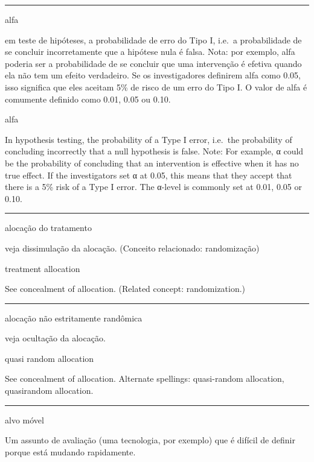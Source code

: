 \documentclass[
]{book}
\begin{document}
\begin{center}\rule{0.5\linewidth}{0.5pt}\end{center}

alfa

em teste de hipóteses, a probabilidade de erro do Tipo I, i.e.~a probabilidade de se concluir incorretamente que a hipótese nula é falsa. Nota: por exemplo, alfa poderia ser a probabilidade de se concluir que uma intervenção é efetiva quando ela não tem um efeito verdadeiro. Se os investigadores definirem alfa como 0.05, isso significa que eles aceitam 5\% de risco de um erro do Tipo I. O valor de alfa é comumente definido como 0.01, 0.05 ou 0.10.

alfa

In hypothesis testing, the probability of a Type I error, i.e.~the probability of concluding incorrectly that a null hypothesis is false. Note: For example, α could be the probability of concluding that an intervention is effective when it has no true effect. If the investigators set α at 0.05, this means that they accept that there is a 5\% risk of a Type I error. The α-level is commonly set at 0.01, 0.05 or 0.10.

\begin{center}\rule{0.5\linewidth}{0.5pt}\end{center}

alocação do tratamento

veja dissimulação da alocação. (Conceito relacionado: randomização)

treatment allocation

See concealment of allocation. (Related concept: randomization.)

\begin{center}\rule{0.5\linewidth}{0.5pt}\end{center}

alocação não estritamente randômica

veja ocultação da alocação.

quasi random allocation

See concealment of allocation. Alternate spellings: quasi-random allocation, quasirandom allocation.

\begin{center}\rule{0.5\linewidth}{0.5pt}\end{center}

alvo móvel

Um assunto de avaliação (uma tecnologia, por exemplo) que é difícil de definir porque está mudando rapidamente.
\end{document}
